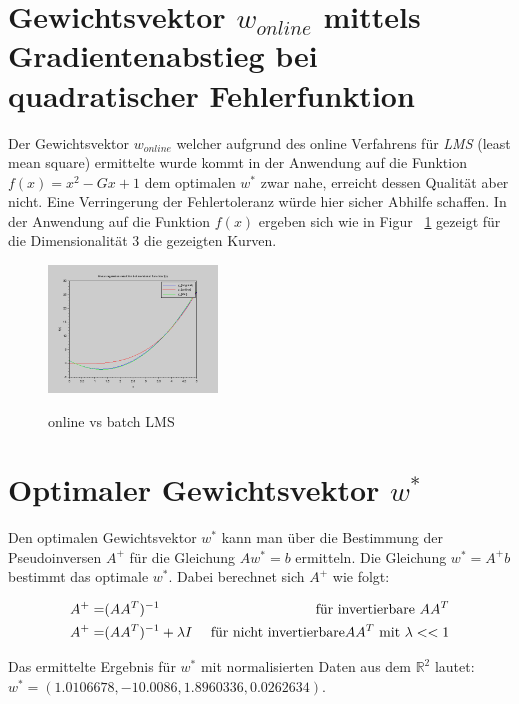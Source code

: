 \documentclass[]{report}
\begin{document}
\section{Gewichtsvektor $w_{online}$ mittels Gradientenabstieg bei quadratischer Fehlerfunktion}

Der Gewichtsvektor $w_{online}$ welcher aufgrund des online Verfahrens f\"ur \emph{LMS} (least mean square) ermittelte wurde kommt in der Anwendung auf die Funktion $f(x)=x^2-Gx+1$ dem optimalen $w^*$ zwar nahe, erreicht dessen Qualit\"at aber nicht. Eine Verringerung der Fehlertoleranz w\"urde hier sicher Abhilfe schaffen.
In der Anwendung auf die Funktion $f(x)$ ergeben sich wie in Figur ~\ref{fig:onlineVsBatchLMS} gezeigt f\"ur die Dimensionalit\"at $3$ die gezeigten Kurven.
  
\begin{figure}[h]
\centering
\includegraphics[width=0.4\textwidth]{./images/OnlineVsBatchLMS.png} \\
\caption{online vs batch LMS}
\label{fig:onlineVsBatchLMS}
\end{figure}  

\section{Optimaler Gewichtsvektor $w^*$}

Den optimalen Gewichtsvektor $w^*$ kann man \"uber die Bestimmung der Pseudoinversen $A^+$ f\"ur die Gleichung $Aw^*=b$ ermitteln.
Die Gleichung $w^*=A^+b$ bestimmt das optimale $w^*$. 
Dabei berechnet sich $A^+$ wie folgt:

\begin{eqnarray}
A^+ =& (AA^T)^{-1} &\textnormal{ f\"ur invertierbare } AA^T \\
A^+ =& (AA^T)^{-1} + \lambda I &\textnormal{ f\"ur nicht invertierbare} AA^T \textnormal{ mit } \lambda<<1
\end{eqnarray}

Das ermittelte Ergebnis f\"ur $w^*$ mit normalisierten Daten aus dem $\mathbb{R}^2$ lautet: $w^*=(1.0106678, - 10.0086, 1.8960336, 0.0262634)$.
\end{document}
